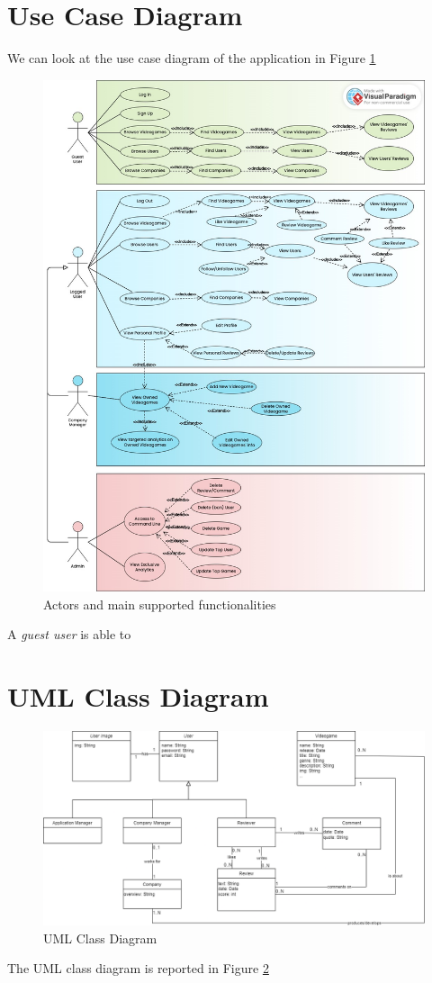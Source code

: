 \section{Use Case Diagram}
We can look at the use case diagram of the application in Figure \ref{fig:usecase}
\begin{figure}[hbt!]
	\centering
	\includegraphics[width=1\textwidth]{chapter3/img/usecase.jpg}
	\caption{Actors and main supported functionalities}
	\label{fig:usecase}
\end{figure}
A \emph{guest user} is able to 
\section{UML Class Diagram}
\begin{figure}[hbt!]
	\centering
	\includegraphics[width=1\textwidth]{chapter3/img/uml.png}
	\caption{UML Class Diagram}
	\label{fig:uml}
\end{figure}
The UML class diagram is reported in Figure \ref{fig:uml}
